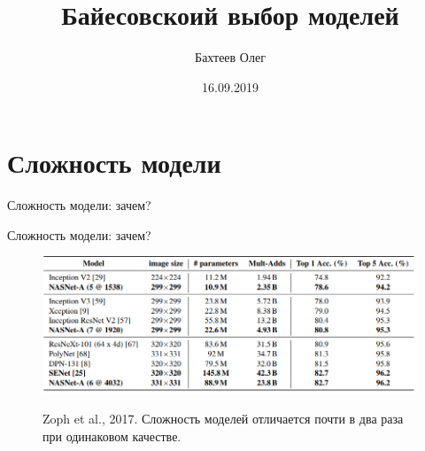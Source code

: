 \documentclass[usenames,dvipsnames,10pt,pdf,utf8,russian,aspectratio=43]{beamer}
\title[Выбор модели]{Байесовскоий выбор моделей}
\author{Бахтеев Олег}
\date{16.09.2019}
\begin{document}

\begin{frame}
  \titlepage
\end{frame}


\section{Сложность модели}
\begin{frame}{Сложность модели: зачем?}
\begin{figure}
  \centering
\label{fig:1}\qquad

\end{figure}


\end{frame}

\begin{frame}{Сложность модели: зачем?}

\begin{figure}
  \centering
 {\includegraphics[width=\textwidth]{zoph.png}}
\label{fig:1}\qquad
\caption*{Zoph et al., 2017.  Сложность моделей отличается почти в два раза при одинаковом качестве.}
\end{figure}
\end{frame}
\end{document}
